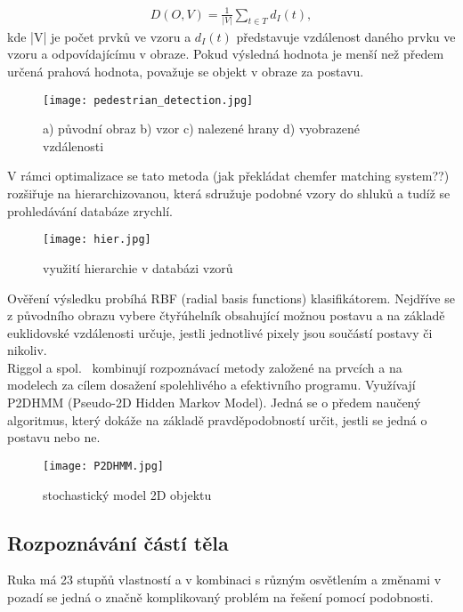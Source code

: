 \begin{eqnarray}
 D(O,V) = \frac{1}{|V|}\sum_{t\in T}^{}d_{I}(t) ,
\end{eqnarray}
kde |V| je počet prvků ve vzoru a $ d_{I}(t) $ představuje vzdálenost daného prvku ve vzoru a odpovídajícímu v obraze. Pokud výsledná hodnota je menší než předem určená prahová hodnota, považuje se objekt v obraze za postavu. 

\begin{figure}[h]
\centering
\texttt{[image: pedestrian\_detection.jpg]}
\caption{a) původní obraz b) vzor c) nalezené hrany d) vyobrazené vzdálenosti~\cite{7} }
\end{figure}

V rámci optimalizace se tato metoda (jak překládat chemfer matching system??) rozšiřuje na hierarchizovanou, která sdružuje podobné vzory do shluků a tudíž se prohledávání databáze zrychlí.
\begin{figure}[h]
\centering
\texttt{[image: hier.jpg]}
\caption{využití hierarchie v databázi vzorů~\cite{7} }
\end{figure}

Ověření výsledku probíhá RBF (radial basis functions) klasifikátorem. Nejdříve se z původního obrazu vybere čtyřúhelník obsahující možnou postavu a na základě euklidovské vzdálenosti určuje, jestli jednotlivé pixely jsou součástí postavy či nikoliv.\\

Riggol a spol.~\cite{11} kombinují rozpoznávací metody založené na prvcích a na modelech za cílem dosažení spolehlivého a efektivního programu. Využívají P2DHMM (Pseudo-2D Hidden Markov Model). Jedná se o předem naučený algoritmus, který dokáže na základě pravděpodobností určit, jestli se jedná o postavu nebo ne.\\
\begin{figure}[h]
\centering
\texttt{[image: P2DHMM.jpg]}
\caption{stochastický model 2D objektu ~\cite{11} } %
\end{figure}


\subsection{Rozpoznávání částí těla}
Ruka má 23 stupňů vlastností a v kombinaci s různým osvětlením a změnami v pozadí se jedná o značně komplikovaný problém na řešení pomocí podobnosti.\\

